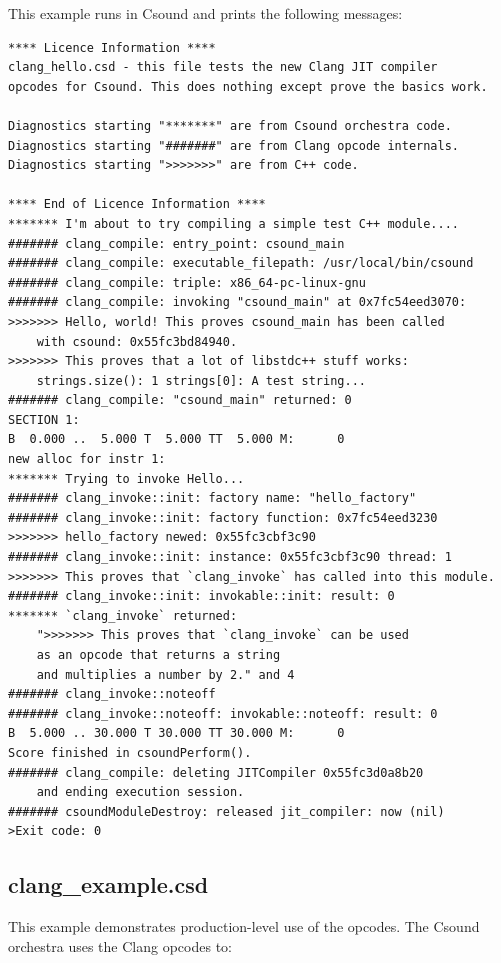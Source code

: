 \documentclass[letterpaper, 12pt]{article}
\begin{document}
This example runs in Csound and prints the following messages:

\begin{Verbatim}[fontfamily=courier, xleftmargin=\parindent]
**** Licence Information ****
clang_hello.csd - this file tests the new Clang JIT compiler 
opcodes for Csound. This does nothing except prove the basics work.

Diagnostics starting "*******" are from Csound orchestra code.
Diagnostics starting "#######" are from Clang opcode internals.
Diagnostics starting ">>>>>>>" are from C++ code.

**** End of Licence Information ****
******* I'm about to try compiling a simple test C++ module....
####### clang_compile: entry_point: csound_main
####### clang_compile: executable_filepath: /usr/local/bin/csound
####### clang_compile: triple: x86_64-pc-linux-gnu
####### clang_compile: invoking "csound_main" at 0x7fc54eed3070:
>>>>>>> Hello, world! This proves csound_main has been called 
	with csound: 0x55fc3bd84940.
>>>>>>> This proves that a lot of libstdc++ stuff works: 
	strings.size(): 1 strings[0]: A test string...
####### clang_compile: "csound_main" returned: 0
SECTION 1:
B  0.000 ..  5.000 T  5.000 TT  5.000 M:      0  
new alloc for instr 1:
******* Trying to invoke Hello...
####### clang_invoke::init: factory name: "hello_factory"
####### clang_invoke::init: factory function: 0x7fc54eed3230
>>>>>>> hello_factory newed: 0x55fc3cbf3c90
####### clang_invoke::init: instance: 0x55fc3cbf3c90 thread: 1
>>>>>>> This proves that `clang_invoke` has called into this module.
####### clang_invoke::init: invokable::init: result: 0
******* `clang_invoke` returned: 
	">>>>>>> This proves that `clang_invoke` can be used 
	as an opcode that returns a string 
	and multiplies a number by 2." and 4
####### clang_invoke::noteoff
####### clang_invoke::noteoff: invokable::noteoff: result: 0
B  5.000 .. 30.000 T 30.000 TT 30.000 M:      0  
Score finished in csoundPerform().
####### clang_compile: deleting JITCompiler 0x55fc3d0a8b20 
	and ending execution session.
####### csoundModuleDestroy: released jit_compiler: now (nil)
>Exit code: 0
\end{Verbatim}

\subsection{clang\_example.csd}

This example demonstrates production-level use of the opcodes. The Csound orchestra uses the Clang opcodes to:
\end{document}
